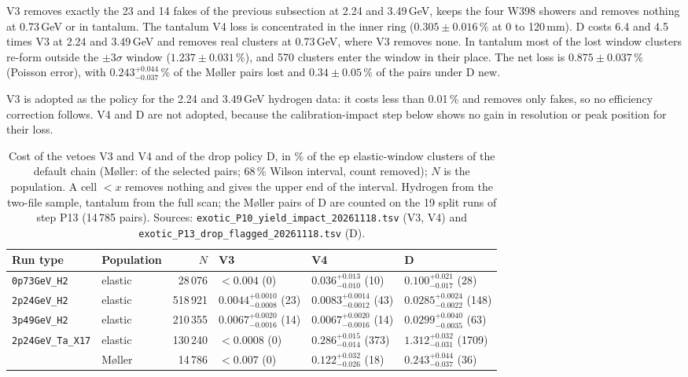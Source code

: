 \documentclass[11pt]{article}
\newcommand{\code}[1]{\texttt{#1}}
\begin{document}
V3 removes exactly the 23 and 14 fakes of the previous subsection at 2.24 and 3.49\,GeV, keeps the four W398 showers and removes nothing at 0.73\,GeV or in tantalum. The tantalum V4 loss is concentrated in the inner ring ($0.305 \pm 0.016\,\%$ at 0 to 120\,mm). D costs 6.4 and 4.5 times V3 at 2.24 and 3.49\,GeV and removes real clusters at 0.73\,GeV, where V3 removes none. In tantalum most of the lost window clusters re-form outside the $\pm 3\sigma$ window ($1.237 \pm 0.031\,\%$), and 570 clusters enter the window in their place. The net loss is $0.875 \pm 0.037\,\%$ (Poisson error), with $0.243^{+0.044}_{-0.037}\,\%$ of the M\o ller pairs lost and $0.34 \pm 0.05\,\%$ of the pairs under D new.

V3 is adopted as the policy for the 2.24 and 3.49\,GeV hydrogen data: it costs less than 0.01\,\% and removes only fakes, so no efficiency correction follows. V4 and D are not adopted, because the calibration-impact step below shows no gain in resolution or peak position for their loss.

\begin{table}[htbp]
\centering
\caption{Cost of the vetoes V3 and V4 and of the drop policy D, in \% of the ep elastic-window clusters of the default chain (M\o ller: of the selected pairs; 68\,\% Wilson interval, count removed); $N$ is the population. A cell $<x$ removes nothing and gives the upper end of the interval. Hydrogen from the two-file sample, tantalum from the full scan; the M\o ller pairs of D are counted on the 19 split runs of step P13 (14\,785 pairs). Sources: \code{exotic\_P10\_yield\_impact\_20261118.tsv} (V3, V4) and \code{exotic\_P13\_drop\_flagged\_20261118.tsv} (D).}
\label{tab:exotic_veto}
\small
\begin{tabular}{llrlll}
\toprule
Run type & Population & $N$ & V3 & V4 & D \\
\midrule
\code{0p73GeV\_H2} & elastic & 28\,076 & $<0.004$ (0) & $0.036^{+0.013}_{-0.010}$ (10) & $0.100^{+0.021}_{-0.017}$ (28) \\
\code{2p24GeV\_H2} & elastic & 518\,921 & $0.0044^{+0.0010}_{-0.0008}$ (23) & $0.0083^{+0.0014}_{-0.0012}$ (43) & $0.0285^{+0.0024}_{-0.0022}$ (148) \\
\code{3p49GeV\_H2} & elastic & 210\,355 & $0.0067^{+0.0020}_{-0.0016}$ (14) & $0.0067^{+0.0020}_{-0.0016}$ (14) & $0.0299^{+0.0040}_{-0.0035}$ (63) \\
\code{2p24GeV\_Ta\_X17} & elastic & 130\,240 & $<0.0008$ (0) & $0.286^{+0.015}_{-0.014}$ (373) & $1.312^{+0.032}_{-0.031}$ (1709) \\
 & M\o ller & 14\,786 & $<0.007$ (0) & $0.122^{+0.032}_{-0.026}$ (18) & $0.243^{+0.044}_{-0.037}$ (36) \\
\bottomrule
\end{tabular}
\end{table}
\end{document}
